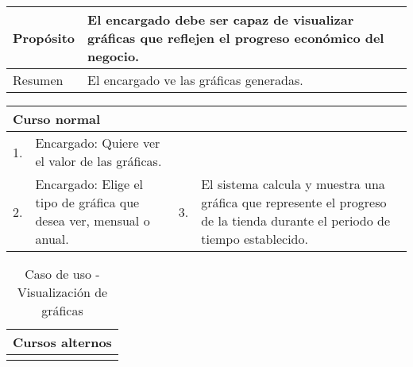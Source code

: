 \begin{table}[H]
	\centering
	\begin{tabular}{| m{} | m{} | m{} | m{} |}
		\hline
		Propósito & \multicolumn{3}{m{0.67\textwidth}|}{El encargado debe ser capaz de visualizar gráficas que reflejen el progreso económico del negocio.}  \\ 
		\hline
		Resumen & \multicolumn{3}{m{0.67\textwidth}|}{El encargado ve las gráficas generadas.} \\ 
		\hline
	\end{tabular}
\end{table}


\begin{table}[H]
	\centering
	\begin{tabular}{| m{} | m{} | m{} | m{} |}
		\hline
		\multicolumn{4}{|m{0.9\textwidth}|}{Curso normal}     \\ 
		\hline
		1. & Encargado: Quiere ver el valor de las gráficas. &  & \\ 
		\hline
		2. & Encargado: Elige el tipo de gráfica que desea ver, mensual o anual. & 3. & El sistema calcula y muestra una gráfica que represente el progreso de la tienda durante el periodo de tiempo establecido.  \\ 
		\hline
	\end{tabular}
\end{table}

\begin{table}[H]
	\centering
	\begin{tabular}{| m{} | m{} | m{} | m{} |}
		\hline
		\multicolumn{4}{|m{0.9\textwidth}|}{Cursos alternos}     \\ 
		\hline
		& \multicolumn{3}{m{0.67\textwidth}|}{} \\ 
		\hline
	\end{tabular}
	\caption{Caso de uso - Visualización de gráficas}
\end{table}


\newpage
